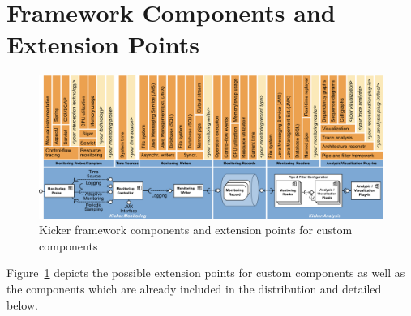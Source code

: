 \section{Framework Components and Extension Points}

\begin{figure}\centering
\includegraphics[width=\textwidth]{images/framework-figure}
\caption{Kicker framework components and extension points for custom components}
\label{fig:frameworkComponentsExtensionPoints}
\end{figure}

Figure~\ref{fig:frameworkComponentsExtensionPoints} depicts the possible %
extension points for custom components as well as the components which %
are already included in the \Kicker{} distribution and detailed below. %

\medskip

